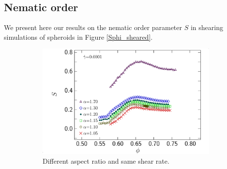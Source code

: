 \documentclass[class=article, float=false, crop=false]{standalone}
\begin{document}

\subsection{Nematic order}

We present here our results on the nematic order parameter $S$ in shearing simulations of spheroids in Figure \ref{Sphi_sheared}.

\begin{figure}[h!]
\centering
    \hfill
    \begin{subfigure}[t]{0.49\textwidth}
        \centering
        \includegraphics[width=\textwidth]{figures/figs/S_phi_el}
        \caption{Different aspect ratio and same shear rate.}
    \end{subfigure}
    \hfill
    \begin{subfigure}[t]{0.49\textwidth}
        \centering

\end{subfigure}
\end{figure}
\end{document}
